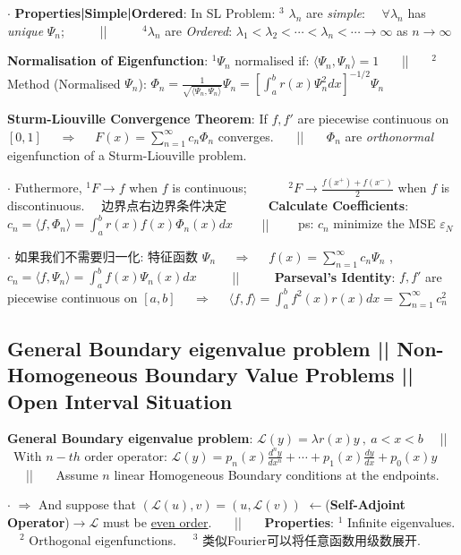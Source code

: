 \documentclass[8pt]{extarticle}
\begin{document}
$\cdot$ \textbf{Properties|Simple|Ordered}: In SL Problem: $^3$ $\lambda_n$ are \textit{simple}: \ \ $\forall\lambda_n$ has \textit{unique} $\Psi_n$; \ \ \ \ \ || \ \ \ \ \ $^4\lambda_n$ are \textit{Ordered}: $\lambda_1<\lambda_2<\cdots<\lambda_n<\cdots\to\infty$ as $n\to\infty$

\textbf{Normalisation of Eigenfunction}: $^1\Psi_n$ normalised if: $\langle \Psi_n,\Psi_n \rangle=1$ \ \ \ || \ \ \ $^2$ Method (Normalised $\Psi_n$): $\Phi_n=\frac{1}{\sqrt{\langle \Psi_n,\Psi_n \rangle}}\Psi_n=[\int^b_ar(x)\Psi^2_ndx]^{-1/2}\Psi_n$

\textbf{Sturm-Liouville Convergence Theorem}: If $f,f'$ are piecewise continuous on $[0,1]$ \ \ $\Rightarrow$ \ \ $F(x)=\sum_{n=1}^{\infty}c_n\Phi_n$ converges. \ \ \ || \ \ \ $\Phi_n$ are \textit{orthonormal} eigenfunction of a Sturm-Liouville problem.

$\cdot$ Futhermore, $^1F\to f$ when $f$ is continuous; \ \ \ \ \ \ $^2F\to\frac{f(x^+)+f(x^-)}{2}$ when $f$ is discontinuous. \ \ {\tiny 边界点右边界条件决定} \ \ \ \ \ \ \textbf{Calculate Coefficients}: $c_n=\langle f,\Phi_n\rangle=\int^b_ar(x)f(x)\Phi_n(x)dx$ \ \ \ \ || \ \ \ \ {\tiny ps: $c_n$ minimize the MSE $\varepsilon_N$}

$\cdot$ 如果我们不需要归一化: 特征函数 $\Psi_n$ \ \ $\Rightarrow$ \ \ $f(x)=\sum^\infty_{n=1}c_n\Psi_n$ , $c_n=\langle f,\Psi_n\rangle=\int^b_af(x)\Psi_n(x)dx$ \ \ \ \ \ || \ \ \ \ \ \textbf{Parseval's Identity}: $f,f'$ are piecewise continuous on $[a,b]$ \ \ $\Rightarrow$ \ \ $\langle f,f\rangle=\int^b_af^2(x)r(x)dx=\sum^{\infty}_{n=1}c^2_n$


\subsection{General Boundary eigenvalue problem || Non-Homogeneous Boundary Value Problems || Open Interval Situation}

\vspace{-2pt}
\textbf{General Boundary eigenvalue problem}: $\mathcal{L}(y)=\lambda r(x)y \ , \ a<x<b$ \ \ || \ With $n-th$ order operator: $\mathcal{L}(y)=p_n(x)\frac{d^ny}{dx^n}+\cdots+p_1(x)\frac{dy}{dx}+p_0(x)y$ \ \ \ || \ \ \ {\tiny Assume $n$ linear Homogeneous Boundary conditions at the endpoints.}

$\cdot$ $\Rightarrow$ And suppose that $(\mathcal{L}(u),v )=( u,\mathcal{L}(v) )$ $\leftarrow$(\textbf{Self-Adjoint Operator})$\to\mathcal{L}$ must be \underline{even order}. \ \ \ || \ \ \ \textbf{Properties}: $^1$ Infinite eigenvalues. \ \ $^2$ Orthogonal eigenfunctions. \ \ $^3$ {\tiny 类似Fourier可以将任意函数用级数展开.}
\end{document}
